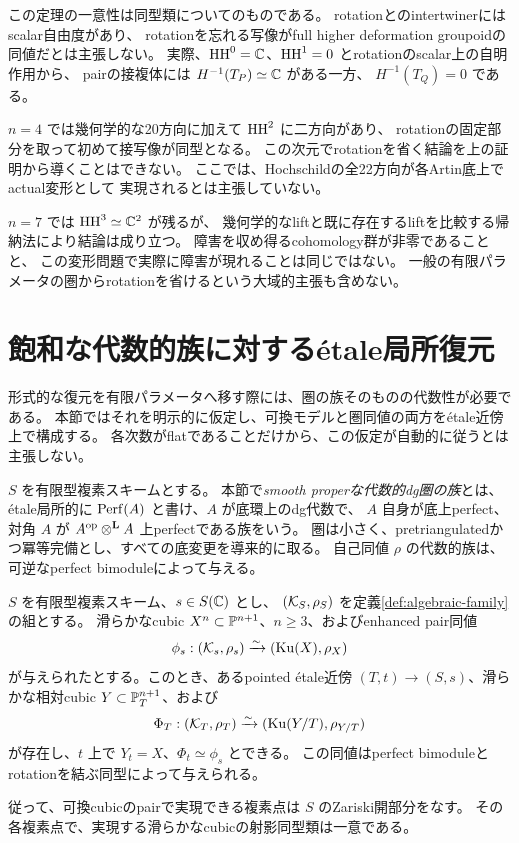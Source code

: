 \begin{remark}\label{rem:unpolarized-scope}
 この定理の一意性は同型類についてのものである。
 rotationとのintertwinerにはscalar自由度があり、
 rotationを忘れる写像がfull higher deformation groupoidの同値だとは主張しない。
 実際、\(\operatorname{HH}^0=\mathbb C\)、\(\operatorname{HH}^1=0\) とrotationのscalar上の自明作用から、
 pairの接複体には \(H^{-1}(T_P)\simeq\mathbb C\) がある一方、
 \(H^{-1}(T_Q)=0\) である。

 \(n=4\) では幾何学的な20方向に加えて \(\operatorname{HH}^2\) に二方向があり、
 rotationの固定部分を取って初めて接写像が同型となる。
 この次元でrotationを省く結論を上の証明から導くことはできない。
 ここでは、Hochschildの全22方向が各Artin底上でactual変形として
 実現されるとは主張していない。

 \(n=7\) では \(\operatorname{HH}^3\simeq\mathbb C^2\) が残るが、
 幾何学的なliftと既に存在するliftを比較する帰納法により結論は成り立つ。
 障害を収め得るcohomology群が非零であることと、
 この変形問題で実際に障害が現れることは同じではない。
 一般の有限パラメータの圏からrotationを省けるという大域的主張も含めない。
\end{remark}

\section{飽和な代数的族に対するétale局所復元}\label{sec:algebraization}

形式的な復元を有限パラメータへ移す際には、圏の族そのものの代数性が必要である。
本節ではそれを明示的に仮定し、可換モデルと圏同値の両方をétale近傍上で構成する。
各次数がflatであることだけから、この仮定が自動的に従うとは主張しない。

\begin{definition}\label{def:algebraic-family}
 \(S\) を有限型複素スキームとする。
 本節で\emph{smooth properな代数的dg圏の族}とは、
 étale局所的に \(\operatorname{Perf}(A)\) と書け、\(A\) が底環上のdg代数で、
 \(A\) 自身が底上perfect、対角 \(A\) が \(A^{\mathrm{op}}\mathbin{\otimes^{\mathbf L}} A\) 上perfectである族をいう。
 圏は小さく、pretriangulatedかつ冪等完備とし、すべての底変更を導来的に取る。
 自己同値 \(\rho\) の代数的族は、可逆なperfect bimoduleによって与える。
\end{definition}

\begin{theorem}[étale局所的な可換復元]\label{thm:etale}
 \(S\) を有限型複素スキーム、\(s\in S(\mathbb C)\) とし、
 \((\mathcal K_S,\rho_S)\) を定義\ref{def:algebraic-family}の組とする。
 滑らかなcubic \(X^n\subset\mathbb P^{n+1}\)、\(n\ge3\)、およびenhanced pair同値
 \[
 \phi_s:(\mathcal K_s,\rho_s)\xrightarrow{\sim}(\operatorname{Ku}(X),\rho_X)
 \]
 が与えられたとする。このとき、あるpointed étale近傍
 \((T,t)\to(S,s)\)、滑らかな相対cubic \(Y\subset\mathbb P^{n+1}_T\)、および
 \[
 \Phi_T:(\mathcal K_T,\rho_T)\xrightarrow{\sim}(\operatorname{Ku}(Y/T),\rho_{Y/T})
 \]
 が存在し、\(t\) 上で \(Y_t=X\)、\(\Phi_t\simeq\phi_s\) とできる。
 この同値はperfect bimoduleとrotationを結ぶ同型によって与えられる。

 従って、可換cubicのpairで実現できる複素点は \(S\) のZariski開部分をなす。
 その各複素点で、実現する滑らかなcubicの射影同型類は一意である。
\end{theorem}

